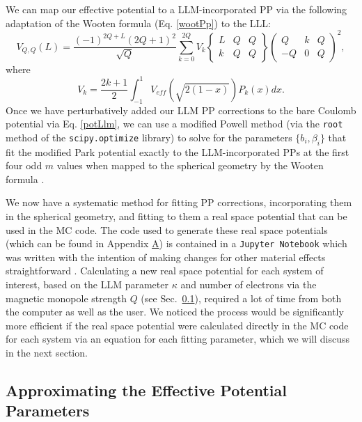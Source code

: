     We can map our effective potential to a LLM-incorporated PP via the following adaptation of the Wooten formula (Eq. \ref{wootPp}) to the LLL: 
    \begin{equation} \label{wootPpN0}
    V_{Q,Q}(L)=\frac{(-1)^{2Q+L}(2Q+1)^2}{\sqrt{Q}}\sum_{k=0}^{2Q}V_k
    \begin{Bmatrix}
    L&Q&Q\\k&Q&Q
    \end{Bmatrix}
    \begin{pmatrix}Q&k&Q\\
    -Q&0&Q
    \end{pmatrix}^2,
    \end{equation}
    where 
    \begin{equation} \label{wootPpVkN0}
    V_k=\frac{2k+1}{2}\int_{-1}^1V_{eff}(\sqrt{2(1-x)})P_k(x)dx.
    \end{equation}
    Once we have perturbatively added our LLM PP corrections to the bare Coulomb potential via Eq. \ref{potLlm}, we can use a modified Powell method (via the \texttt{root} method of the \texttt{scipy.optimize} library) to solve for the parameters $\{b_i,\beta_i\}$ that fit the modified Park potential exactly to the LLM-incorporated PPs at the first four odd $m$ values when mapped to the spherical geometry by the Wooten formula \cite{scipy}. 
    
    We now have a systematic method for fitting PP corrections, incorporating them in the spherical geometry, and fitting to them a real space potential that can be used in the MC code. The code used to generate these real space potentials (which can be found in Appendix \hyperref[appendixA]{A}) is contained in a \texttt{Jupyter Notebook} which was written with the intention of making changes for other material effects straightforward \cite{ipython}. Calculating a new real space potential for each system of interest, based on the LLM parameter $\kappa$ and number of electrons via the magnetic monopole strength $Q$ (see Sec.~\ref{ssec:apprEffPotPar}), required a lot of time from both the computer as well as the user. We noticed the process would be significantly more efficient if the real space potential were calculated directly in the MC code for each system via an equation for each fitting parameter, which we will discuss in the next section.
    
    \subsection{Approximating the Effective Potential Parameters} \label{ssec:apprEffPotPar}
    
